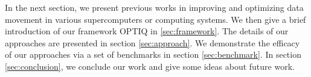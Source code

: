 In the next section, we present previous works in improving and optimizing data movement in various supercomputers or computing systems. We then give a brief introduction of our framework OPTIQ in \ref{sec:framework}. The details of our approaches are presented in section \ref{sec:approach}. We demonstrate the efficacy of our approaches via a set of benchmarks in section \ref{sec:benchmark}. In section \ref{sec:conclusion}, we conclude our work and give some ideas about future work.
